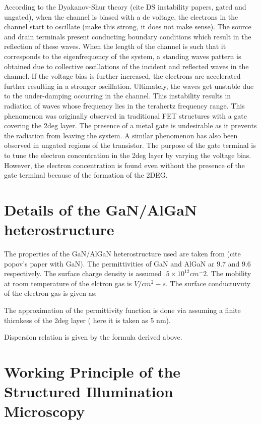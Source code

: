 \documentclass[11pt]{article}
\begin{document}
According to the Dyakanov-Shur theory (cite DS instability papers, gated and ungated), when the channel is biased with a dc voltage, the electrons in the channel start to oscillate (make this strong, it does not make sense). The source and drain terminals present conducting boundary conditions which result in the reflection of these waves. When the length of the channel is such that it corresponds to the eigenfrequency of the system, a standing waves pattern is obtained due to collective oscillations of the incident and reflected waves in the channel. If the voltage bias is further increased, the electrons are accelerated further resulting in a stronger oscillation. Ultimately, the waves get unstable due to the under-damping occurring in the channel. This instability results in radiation of waves whose frequency lies in the terahertz frequency range. This phenomenon was originally observed in traditional FET structures with a gate covering the 2deg layer. The presence of a metal gate is undesirable as it prevents the radiation from leaving the system. A similar phenomenon has also been observed in ungated regions of the transistor. The purpose of the gate terminal is to tune the electron concentration in the 2deg layer by varying the voltage bias. However, the electron concentration is found even without the presence of the gate terminal because of the formation of the 2DEG.

\section{Details of the GaN/AlGaN heterostructure}

The properties of the GaN/AlGaN heterostructure used are taken from (cite popov's paper with GaN). The permittivities of GaN and AlGaN ar $9.7$ and 9.6 respectively. The surface charge density is assumed $.5 \times 10^12 cm^-2$. The mobility at room temperature of the elctron gas is  $V/cm^2-s$. The surface conductuvuty of the electron gas is given as:


The approximation of the permittivity function is done via assuming a finite thicnkess of the 2deg layer ( here it is taken as 5 nm).

Dispersion relation is given by the formula derived above.

\section{Working Principle of the Structured Illumination Microscopy}
\end{document}
